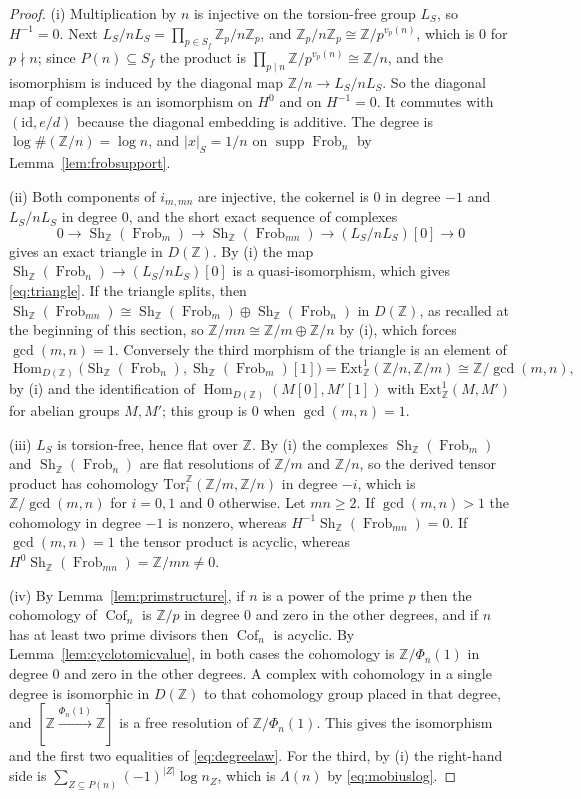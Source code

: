 \documentclass[11pt]{amsart}
\theoremstyle{definition}
\newcommand{\Z}{\mathbb Z}
\newcommand{\Frob}{\operatorname{Frob}}
\newcommand{\Sh}{\operatorname{Sh}}
\newcommand{\Prim}{\operatorname{Cof}}
\newcommand{\supp}{\operatorname{supp}}
\newcommand{\Hom}{\operatorname{Hom}}
\begin{document}
\begin{proof}
(i) Multiplication by $n$ is injective on the torsion-free group $L_S$, so
$H^{-1}=0$.  Next $L_S/nL_S=\prod_{p\in S_f}\Z_p/n\Z_p$, and
$\Z_p/n\Z_p\cong\Z/p^{v_p(n)}$, which is $0$ for $p\nmid n$; since
$P(n)\subseteq S_f$ the product is $\prod_{p\mid n}\Z/p^{v_p(n)}\cong\Z/n$,
and the isomorphism is induced by the diagonal map $\Z/n\to L_S/nL_S$.  So the
diagonal map of complexes is an isomorphism on $H^0$ and on $H^{-1}=0$.  It
commutes with $(\mathrm{id},e/d)$ because the diagonal embedding is additive.
The degree is $\log\#(\Z/n)=\log n$, and $|x|_S=1/n$ on $\supp\Frob_n$ by
Lemma~\ref{lem:frobsupport}.

(ii) Both components of $i_{m,mn}$ are injective, the cokernel is $0$ in
degree $-1$ and $L_S/nL_S$ in degree $0$, and the short exact sequence of
complexes
\[
  0\to\Sh_\Z(\Frob_m)\to\Sh_\Z(\Frob_{mn})\to(L_S/nL_S)[0]\to0
\]
gives an exact triangle in $D(\Z)$.  By (i) the map
$\Sh_\Z(\Frob_n)\to(L_S/nL_S)[0]$ is a quasi-isomorphism, which gives
\eqref{eq:triangle}.  If the triangle splits, then
$\Sh_\Z(\Frob_{mn})\cong\Sh_\Z(\Frob_m)\oplus\Sh_\Z(\Frob_n)$ in $D(\Z)$, as
recalled at the beginning of this section, so
$\Z/mn\cong\Z/m\oplus\Z/n$ by (i), which forces $\gcd(m,n)=1$.  Conversely
the third morphism of the triangle is an element of
\[
  \Hom_{D(\Z)}\bigl(\Sh_\Z(\Frob_n),\Sh_\Z(\Frob_m)[1]\bigr)
   =\mathrm{Ext}^1_\Z(\Z/n,\Z/m)\cong\Z/\gcd(m,n),
\]
by (i) and the identification of
$\Hom_{D(\Z)}(M[0],M'[1])$ with $\mathrm{Ext}^1_\Z(M,M')$ for abelian groups
$M,M'$; this group is $0$ when $\gcd(m,n)=1$.

(iii) $L_S$ is torsion-free, hence flat over $\Z$.  By (i) the complexes
$\Sh_\Z(\Frob_m)$ and $\Sh_\Z(\Frob_n)$ are flat resolutions of $\Z/m$ and
$\Z/n$, so the derived tensor product has cohomology
$\mathrm{Tor}_i^\Z(\Z/m,\Z/n)$ in degree $-i$, which is $\Z/\gcd(m,n)$ for
$i=0,1$ and $0$ otherwise.  Let $mn\ge2$.  If $\gcd(m,n)>1$ the cohomology in
degree $-1$ is nonzero, whereas $H^{-1}\Sh_\Z(\Frob_{mn})=0$.  If
$\gcd(m,n)=1$ the tensor product is acyclic, whereas
$H^0\Sh_\Z(\Frob_{mn})=\Z/mn\ne0$.

(iv) By Lemma~\ref{lem:primstructure}, if $n$ is a power of the prime $p$
then the cohomology of $\Prim_n$ is $\Z/p$ in degree $0$ and zero in the
other degrees, and if $n$ has at least two prime divisors then $\Prim_n$ is
acyclic.  By Lemma~\ref{lem:cyclotomicvalue}, in both cases the cohomology is
$\Z/\Phi_n(1)$ in degree $0$ and zero in the other degrees.  A complex with cohomology
in a single degree is isomorphic in $D(\Z)$ to that cohomology group placed in
that degree, and $[\Z\xrightarrow{\Phi_n(1)}\Z]$ is a free resolution of
$\Z/\Phi_n(1)$.  This gives the isomorphism and the first two equalities of
\eqref{eq:degreelaw}.  For the third, by (i) the right-hand side is
$\sum_{Z\subseteq P(n)}(-1)^{|Z|}\log n_Z$, which is $\Lambda(n)$ by
\eqref{eq:mobiuslog}.
\end{proof}
\end{document}
